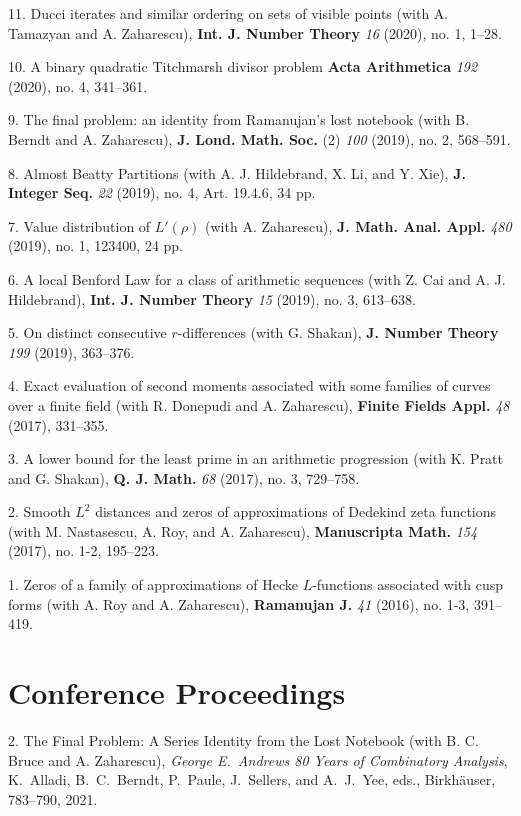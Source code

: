 \documentclass[margin,line,pifont,palatino,courier,10pt]{res}
\begin{document}
\begin{resume}
11. {Ducci iterates and similar ordering on sets of visible points} (with A. Tamazyan and A. Zaharescu), \textbf{ Int. J. Number Theory} \emph{16} (2020), no. 1, 1--28.

10. {A binary quadratic Titchmarsh divisor problem}
\textbf{ Acta Arithmetica} \emph{192} (2020), no. 4, 341--361. %

9. {The final problem: an identity from Ramanujan's lost notebook} (with B. Berndt and A. Zaharescu), \textbf{ J. Lond. Math. Soc.} (2) \emph{100} (2019), no. 2, 568--591.

8. {Almost Beatty Partitions} (with A. J. Hildebrand, X. Li, and Y. Xie), {\textbf{ J. Integer Seq.} \emph{22} (2019), no. 4, Art. 19.4.6, 34 pp.}

7. {Value distribution of $L'(\rho)$} (with A. Zaharescu), {\textbf{ J. Math. Anal. Appl.} \emph{480} (2019), no. 1, 123400, 24 pp.}

6. {A local Benford Law for a class of arithmetic sequences} (with Z. Cai and A. J. Hildebrand), \textbf{ Int. J. Number Theory} \emph{15} (2019), no. 3, 613--638.

5. {On distinct consecutive $r$-differences} (with G. Shakan), \textbf{ J. Number Theory} \emph{199} (2019), 363--376.

4. {Exact evaluation of second moments associated with some families of
	curves over a finite field} (with R. Donepudi and A. Zaharescu), \textbf{ Finite Fields Appl.} \emph{48} (2017), 331--355.

3. {A lower bound for the least prime in an arithmetic progression} (with K. Pratt and G. Shakan), \textbf{ Q. J. Math.} \emph{68} (2017), no. 3, 729--758.

2. {Smooth {$L^2$} distances and zeros of approximations of {D}edekind zeta functions} (with M. Nastasescu, A. Roy, and A. Zaharescu), \textbf{ Manuscripta Math.}  \emph{154} (2017), no. 1-2, 195--223.

1. {Zeros of a family of approximations of {H}ecke {$L$}-functions
	associated with cusp forms} (with A. Roy and A. Zaharescu), \textbf{ Ramanujan J.} \emph{41} (2016), no. 1-3, 391--419.


\section{\sc Conference Proceedings}
2. {The Final Problem: A Series Identity from the Lost Notebook} (with B. C. Bruce and A. Zaharescu),  \emph{ George E.~Andrews 80 Years of Combinatory Analysis}, K.~Alladi, B.~C.~Berndt, P.~Paule, J.~Sellers, and A.~J.~Yee, eds.,  Birkh\"{a}user, 783--790, 2021.


\end{resume}
\end{document}
